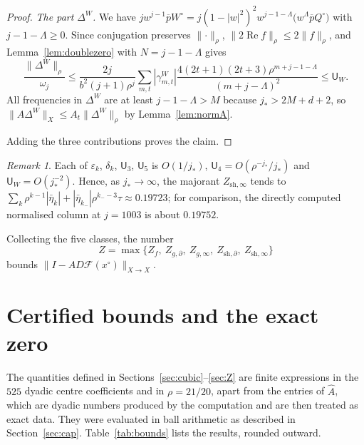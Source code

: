 \documentclass[11pt]{amsart}
\theoremstyle{definition}
\theoremstyle{remark}
\newtheorem{remark}[theorem]{Remark}
\numberwithin{equation}{section}
\newcommand{\Fc}{\mathcal{F}}
\newcommand{\eps}{\varepsilon}
\newcommand{\jst}{j_*}
\newcommand{\sU}{\mathsf{U}}
\DeclareMathOperator{\re}{Re}
\newcommand{\nrm}[1]{\lVert #1\rVert}
\begin{document}
\begin{proof}
\emph{The part $\Delta^W$.} We have $jw^{j-1}\overline pW^\circ=j(1-|w|^2)^2w^{j-1-\Lambda}\big(w^\Lambda\overline pQ^\circ\big)$ with $j-1-\Lambda\geq0$. Since conjugation preserves $\nrm\cdot_\rho$, $\nrm{2\re f}_\rho\leq2\nrm f_\rho$, and Lemma~\ref{lem:doublezero} with $N=j-1-\Lambda$ gives
\[
\frac{\nrm{\Delta^W}_\rho}{\omega_j}\leq\frac{2j}{b^2(j+1)\rho^j}\sum_{m,t}|\gamma^W_{m,t}|\frac{4(2t+1)(2t+3)\rho^{m+j-1-\Lambda}}{(m+j-\Lambda)^2}\leq\sU_W .
\]
All frequencies in $\Delta^W$ are at least $j-1-\Lambda>M$ because $\jst>2M+d+2$, so $\nrm{A\Delta^W}_X\leq A_t\nrm{\Delta^W}_\rho$ by Lemma~\ref{lem:normA}.

Adding the three contributions proves the claim.
\end{proof}

\begin{remark}
Each of $\eps_k$, $\delta_k$, $\sU_3$, $\sU_5$ is $O(1/\jst)$, $\sU_4=O(\rho^{-\jst}/\jst)$ and $\sU_W=O(\jst^{-2})$. Hence, as $\jst\to\infty$, the majorant $Z_{\mathrm{sh},\infty}$ tends to $\sum_k\rho^{k-1}|\bar\eta_k|+|\bar\eta_{k_-}|\rho^{k_--3}\tau\approx0.19723$; for comparison, the directly computed normalised column at $j=1003$ is about $0.19752$.
\end{remark}

Collecting the five classes, the number
\[
Z=\max\{Z_f,\ Z_{g,\partial},\ Z_{g,\infty},\ Z_{\mathrm{sh},\partial},\ Z_{\mathrm{sh},\infty}\}
\]
bounds $\nrm{I-AD\Fc(x^\circ)}_{X\to X}$.

\section{Certified bounds and the exact zero}\label{sec:zero}

The quantities defined in Sections~\ref{sec:cubic}--\ref{sec:Z} are finite expressions in the $525$ dyadic centre coefficients and in $\rho=21/20$, apart from the entries of $\widehat A$, which are dyadic numbers produced by the computation and are then treated as exact data. They were evaluated in ball arithmetic as described in Section~\ref{sec:cap}. Table~\ref{tab:bounds} lists the results, rounded outward.
\end{document}
